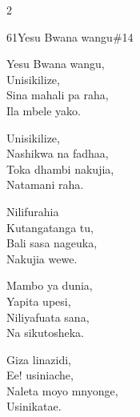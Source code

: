 \documentclass{article}
\begin{document}
\begin{multicols}{2}
\begin{hymn}{61}{Yesu Bwana wangu}{\#14}
\begin{stanza}
Yesu Bwana wangu,\\
Unisikilize,\\
Sina mahali pa raha,\\
Ila mbele yako.
\end{stanza}
\begin{stanza}
Unisikilize,\\
Nashikwa na fadhaa,\\
Toka dhambi nakujia,\\
Natamani raha.
\end{stanza}
\begin{stanza}
Nilifurahia\\
Kutangatanga tu,\\
Bali sasa nageuka,\\
Nakujia wewe.
\end{stanza}
\begin{stanza}
Mambo ya dunia,\\
Yapita upesi,\\
Niliyafuata sana,\\
Na sikutosheka.
\end{stanza}
\begin{stanza}
Giza linazidi,\\
Ee! usiniache,\\
Naleta moyo mnyonge,\\
Usinikatae.
\end{stanza}
\end{hymn}


\end{multicols}
\end{document}
